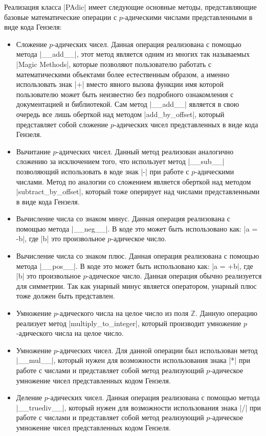 \documentclass[master, och, diploma, times]{sty/SCWorks}
\theoremstyle{plain}
\theoremstyle{definition}
\begin{document}
Реализация класса |PAdic| имеет следующие основные методы, представляющие базовые математические операции с $p$-адическими числами представленными в виде кода Гензеля:

\begin{itemize}
 
\item Сложение $p$-адических чисел. Данная операция реализована с помощью метода |__add__|, этот метод является одним из многих так называемых |Magic Methods|, которые позволяют пользователю работать с математическими объектами более естественным образом, а именно использовать знак |+| вместо явного вызова функции имя которой пользователю может быть неизвестно без подробного ознакомления с документацией и библиотекой. Сам метод |__add__| является в свою очередь все лишь оберткой над методом |add_by_offset|, который представляет собой сложение $p$-адических чисел представленных в виде кода Гензеля.
\item Вычитание $p$-адических чисел. Данный метод реализован аналогично сложению за исключением того, что использует метод |__sub__| позволяющий использовать в коде знак |-| при работе с $p$-адическими числами. Метод по аналогии со сложением является оберткой над методом |subtract_by_offset|, который тоже оперирует над числами представленными в виде кода Гензеля.
\item Вычисление числа со знаком минус. Данная операция реализована с помощью метода |__neg__|. В коде это может быть использовано как: |a = -b|, где |b| это произвольное $p$-адическое число.
\item Вычисление числа со знаком плюс. Данная операция реализована с помощью метода |__pos__|. В коде это может быть использовано как: |a = +b|, где |b| это произвольное $p$-адическое число. Данная операция обычно реализуется для симметрии. Так как унарный минус является оператором, унарный плюс тоже должен быть представлен.
\item Умножение $p$-адического числа на целое число из поля $\mathbb{Z}$. Данную операцию реализует метод |multiply_to_integer|, который производит умножение $p$-адического числа на целое число.
\item Умножение $p$-адических чисел. Для данной операции был использован метод |__mul__|, который нужен для возможности использования знака |*| при работе с числами и представляет собой метод реализующий $p$-адическое умножение чисел представленных кодом Гензеля.
\item Деление $p$-адических чисел. Данная операция реализована с помощью метода |__truediv__|, который нужен для возможности использования знака |/| при работе с числами и представляет собой метод реализующий $p$-адическое умножение чисел представленных кодом Гензеля.

\end{itemize}
\end{document}
